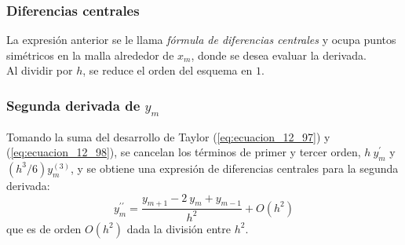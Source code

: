 \begin{frame}
\frametitle{Diferencias centrales}
La expresión anterior se le llama \emph{fórmula de diferencias centrales} y ocupa puntos simétricos en la malla alrededor de $x_{m}$, donde se desea evaluar la derivada.
\\
\bigskip
Al dividir por $h$, se reduce el orden del esquema en $1$.
\end{frame}
\begin{frame}
\frametitle{Segunda derivada de $y_{m}$}
Tomando la suma del desarrollo de Taylor (\ref{eq:ecuacion_12_97}) y (\ref{eq:ecuacion_12_98}), se cancelan los términos de primer y tercer orden, $h \: y^{\prime}_{m}$ y $(h^{3}/6) y^{(3)}_{m}$, y se obtiene una expresión de diferencias centrales para la segunda derivada:
\begin{equation}
y^{\prime \prime}_{m} = \dfrac{y_{m + 1} - 2 \: y_{m} + y_{m - 1}}{h^{2}} + O(h^{2})
\label{eq:ecuacion_12_101}
\end{equation}
que es de orden $O(h^{2})$ dada la división entre $h^{2}$.
\end{frame}
